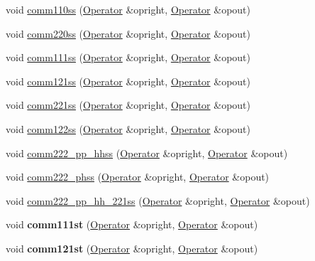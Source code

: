 \begin{DoxyCompactItemize}
\item 
void \hyperlink{classOperator_a23bf6f89477ba90fd6f798374d00d9ea}{comm110ss} (\hyperlink{classOperator}{Operator} \&opright, \hyperlink{classOperator}{Operator} \&opout)
\item 
void \hyperlink{classOperator_ac924a2af30154c83d6b821707689caa5}{comm220ss} (\hyperlink{classOperator}{Operator} \&opright, \hyperlink{classOperator}{Operator} \&opout)
\item 
void \hyperlink{classOperator_a1cfdcf9d390bd8bbfdd4473c6a78071e}{comm111ss} (\hyperlink{classOperator}{Operator} \&opright, \hyperlink{classOperator}{Operator} \&opout)
\item 
void \hyperlink{classOperator_abb92eaedbea81e56c60939588371042f}{comm121ss} (\hyperlink{classOperator}{Operator} \&opright, \hyperlink{classOperator}{Operator} \&opout)
\item 
void \hyperlink{classOperator_a423dc256b5780dbee20ac81c9a655335}{comm221ss} (\hyperlink{classOperator}{Operator} \&opright, \hyperlink{classOperator}{Operator} \&opout)
\item 
void \hyperlink{classOperator_a2214e0f4647940855ff1866c2407c078}{comm122ss} (\hyperlink{classOperator}{Operator} \&opright, \hyperlink{classOperator}{Operator} \&opout)
\item 
void \hyperlink{classOperator_ad70b2fe8c17a836aa8ea8c28ad445fd0}{comm222\-\_\-pp\-\_\-hhss} (\hyperlink{classOperator}{Operator} \&opright, \hyperlink{classOperator}{Operator} \&opout)
\item 
void \hyperlink{classOperator_a030805d35049c5cd62eaa84fe42e59e9}{comm222\-\_\-phss} (\hyperlink{classOperator}{Operator} \&opright, \hyperlink{classOperator}{Operator} \&opout)
\item 
void \hyperlink{classOperator_acb2df128030bcad71f2b3fd975ea7988}{comm222\-\_\-pp\-\_\-hh\-\_\-221ss} (\hyperlink{classOperator}{Operator} \&opright, \hyperlink{classOperator}{Operator} \&opout)
\item 
\hypertarget{classOperator_ad32f3dab6883f4a0bbf3abd416c9c756}{void {\bfseries comm111st} (\hyperlink{classOperator}{Operator} \&opright, \hyperlink{classOperator}{Operator} \&opout)}\label{classOperator_ad32f3dab6883f4a0bbf3abd416c9c756}

\item 
\hypertarget{classOperator_ad6cf6f66211d0893ef0784cde14445f0}{void {\bfseries comm121st} (\hyperlink{classOperator}{Operator} \&opright, \hyperlink{classOperator}{Operator} \&opout)}\label{classOperator_ad6cf6f66211d0893ef0784cde14445f0}


\end{DoxyCompactItemize}
